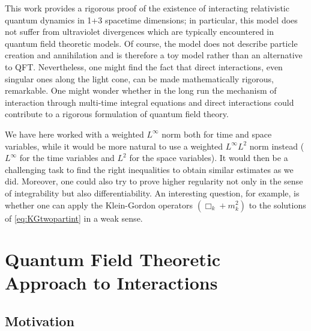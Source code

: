 \documentclass[b5paper,draft,openbib,12pt]{memoir}
\begin{document}
This work provides a rigorous proof of the existence of 
interacting relativistic quantum dynamics in 1+3 spacetime 
dimensions; in particular, this model does not suffer from 
ultraviolet divergences which are typically encountered in 
quantum field theoretic models. Of course, the model does not 
describe particle creation and annihilation and is therefore a 
toy model rather than an alternative to QFT. Nevertheless, one 
might find the fact that direct interactions, even singular ones 
along the light cone, can be made mathematically rigorous, 
remarkable. One might wonder whether in the long 
run the mechanism of 
interaction through multi-time integral equations and direct 
interactions could contribute to a rigorous formulation of 
quantum field theory.


We have here worked with a 
weighted $L^\infty$ norm both for time and space variables, 
while it would be more natural 
to use a weighted $L^\infty L^2$ norm 
instead ($L^\infty$ for the time variables and $L^2$ for the 
space variables). It would then be a challenging task to 
find the right inequalities to obtain similar estimates as we 
did. Moreover, one could also try to prove higher regularity 
not only in the sense of integrability but also 
differentiability. An interesting question, for example, 
is whether one can apply the Klein-Gordon operators 
$(\Box_k + m_k^2)$ to the solutions of \eqref{eq:KGtwopartint} in 
a weak sense. 







\chapter[Quantum Field Theoretic Approach to Interactions][Interaction in QFT]{Quantum Field Theoretic Approach to Interactions} \label{sec:QFT}

\section{Motivation}
\end{document}
